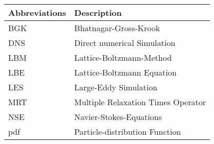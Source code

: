 \vspace{0.5cm}

\begin{tabular}{p{7cm}p{7cm}}
	Abbreviations & Description\\ \hline
	BGK         & Bhatnagar-Gross-Krook \\
	DNS         & Direct numerical Simulation \\
	LBM         & Lattice-Boltzmann-Method \\
	LBE         & Lattice-Boltzmann Equation \\
	LES         & Large-Eddy Simulation \\
	MRT         & Multiple Relaxation Times Operator \\
	NSE         & Navier-Stokes-Equations \\
	pdf         & Particle-distribution Function \\
	
\end{tabular}
